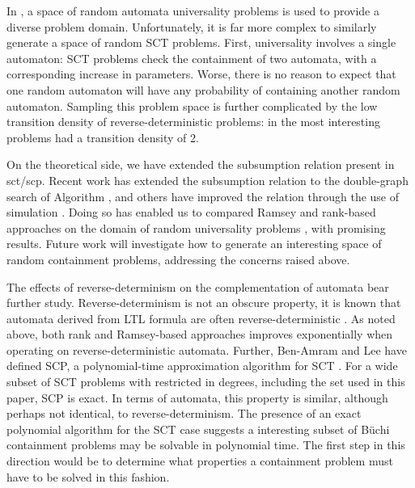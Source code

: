 \documentclass{LMCS}
\newcommand\buchi{B\"uchi }
\begin{document}
In \cite{DR07,TV05}, a space of random automata universality problems is used to provide a diverse
problem domain. Unfortunately, it is far more complex to similarly generate a space of random SCT
problems. First, universality involves a single automaton: SCT problems check the containment of two
automata, with a corresponding increase in parameters. Worse, there is no reason to expect that one
random automaton will have any probability of containing another random automaton.  Sampling this
problem space is further complicated by the low transition density of reverse-deterministic
problems: in \cite{DR07,TV05} the most interesting problems had a transition density of 2.

On the theoretical side, we have extended the subsumption relation
present in sct/scp. Recent work has extended the subsumption relation to the
double-graph search of Algorithm \linebreak[4]\DGS, and others have improved the relation through the use of
simulation \cite{ACHMV10,FV10}. Doing so has enabled us to compared Ramsey and rank-based approaches
on the domain of random universality problems \cite{FV10}, with promising results.  Future work will
investigate how to generate an interesting space of random containment problems, addressing the
concerns raised above. 

The effects of reverse-determinism on the complementation of automata bear
further study.  Reverse-determinism is not an obscure property, it is known that
automata derived from LTL formula are often reverse-deterministic \cite{ES84b}.  As
noted above, both rank and Ramsey-based approaches improves exponentially when
operating on reverse-deterministic automata. Further, Ben-Amram and Lee have
defined SCP, a polynomial-time approximation algorithm for SCT \cite{BL07}. For a wide
subset of SCT problems with restricted in degrees, including the set used in
this paper, SCP is exact.  In terms of automata, this property is similar,
although perhaps not identical, to reverse-determinism.  The presence of an
exact polynomial algorithm for the SCT case suggests a interesting subset of
\buchi containment problems may be solvable in polynomial time. The first step
in this direction would be to determine what properties a containment problem
must have to be solved in this fashion.



\end{document}
